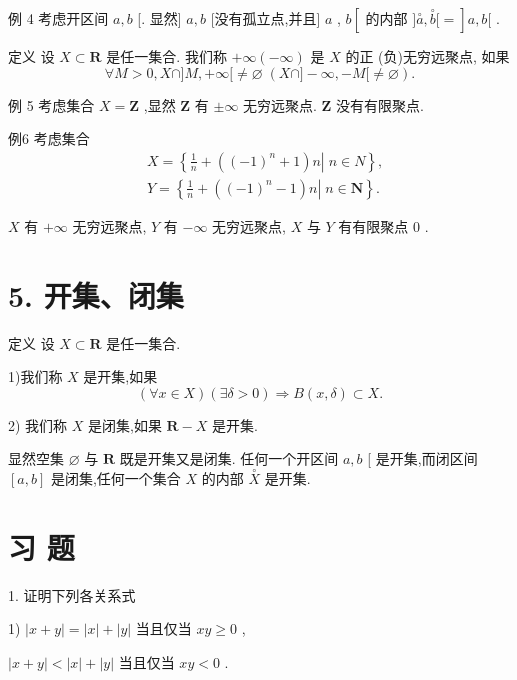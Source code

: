 例 4 考虑开区间 $a,b$ [. 显然] $a,b$ [没有孤立点,并且] $a$ , $b\left\lbrack  {\text{ 的内部 }\rbrack \overset{ \circ  }{a},\overset{ \circ  }{b}\lbrack  = }\right\rbrack  a,b\lbrack$ .

定义 设 $X \subset  \mathbf{R}$ 是任一集合. 我们称 $+ \infty \left( {-\infty }\right)$ 是 $X$ 的正 (负)无穷远聚点, 如果
$$\forall M > 0,X \cap  \rbrack M, + \infty \lbrack  \neq  \varnothing \;\left( {X \cap  \rbrack  - \infty , - M\lbrack  \neq  \varnothing }\right) .$$

例 5 考虑集合 $X = \mathbf{Z}$ ,显然 $\mathbf{Z}$ 有 $\pm  \infty$ 无穷远聚点. $\mathbf{Z}$ 没有有限聚点.

例6 考虑集合
\begin{align*}
	&X = \left\{  {\left. {\frac{1}{n} + \left( {{\left( -1\right) }^{n} + 1}\right) n}\right| \;n \in  N}\right\}  ,\\
	&Y = \left\{  {\left. {\frac{1}{n} + \left( {{\left( -1\right) }^{n} - 1}\right) n}\right| \;n \in  \mathbf{N}}\right\}  .
\end{align*}

$X$ 有 $+ \infty$ 无穷远聚点, $Y$ 有 $- \infty$ 无穷远聚点, $X$ 与 $Y$ 有有限聚点 0 .

\section*{5. 开集、闭集}

定义 设 $X \subset  \mathbf{R}$ 是任一集合.

1)我们称 $X$ 是开集,如果
$$\left( {\forall x \in  X}\right) \left( {\exists \delta  > 0}\right)  \Rightarrow  B\left( {x,\delta }\right)  \subset  X.$$

2) 我们称 $X$ 是闭集,如果 $\mathbf{R} - X$ 是开集.

显然空集 $\varnothing$ 与 $\mathbf{R}$ 既是开集又是闭集. 任何一个开区间 $a,b$ [ 是开集,而闭区间 $\left\lbrack  {a,b}\right\rbrack$ 是闭集,任何一个集合 $X$ 的内部 $\overset{ \circ  }{X}$ 是开集.

\section*{习 题}

1. 证明下列各关系式

1) $\left| {x + y}\right|  = \left| x\right|  + \left| y\right|$ 当且仅当 ${xy} \geq  0$ ,

$\left| {x + y}\right|  < \left| x\right|  + \left| y\right|$ 当且仅当 ${xy} < 0$ .

